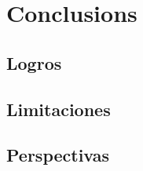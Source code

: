 \chapter{Conclusions}
\label{cap:conclusiones}

\section{Logros}

\section{Limitaciones}

\section{Perspectivas}
